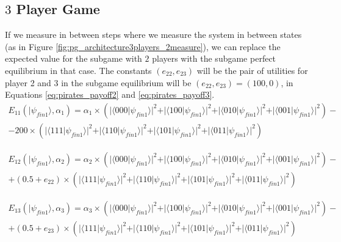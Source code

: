 \subsection{$3$ Player Game}
\label{subsec:3playergame}





If we measure in between steps where we measure the system in between states (as in Figure \ref{fig:pg_architecture3players_2measure}), we can replace the expected value for the subgame with $2$ players with the subgame perfect equilibrium in that case. The constants $(e_{22}, e_{23})$ will be the pair of utilities for player 2 and 3 in the subgame equilibrium will be $(e_{22}, e_{23})=(100, 0)$, in Equations \ref{eq:pirates_payoff2} and \ref{eq:pirates_payoff3}.  
 \begin{equation}
\begin{split}
E_{11}(\vert\psi_{fin1}\rangle, \alpha_{1})=\alpha_{1}\times(\vert\langle000\vert\psi_{fin1}\rangle\vert^{2} + \vert\langle100\vert\psi_{fin1}\rangle\vert^{2}
+ \vert\langle010\vert\psi_{fin1}\rangle\vert^{2}
+ \vert\langle001\vert\psi_{fin1}\rangle\vert^{2}
 ) - \\
 - 200\times(\vert\langle111\vert\psi_{fin1}\rangle\vert^{2} + \vert\langle110\vert\psi_{fin1}\rangle\vert^{2}
+ \vert\langle101\vert\psi_{fin1}\rangle\vert^{2}
+ \vert\langle011\vert\psi_{fin1}\rangle\vert^{2}
 )
\end{split}
\end{equation}

 \begin{equation}
\begin{split}
E_{12}(\vert\psi_{fin1}\rangle, \alpha_{2})=\alpha_{2}\times(\vert\langle000\vert\psi_{fin1}\rangle\vert^{2} + \vert\langle100\vert\psi_{fin1}\rangle\vert^{2}
+ \vert\langle010\vert\psi_{fin1}\rangle\vert^{2}
+ \vert\langle001\vert\psi_{fin1}\rangle\vert^{2}
 ) - \\
 + (0.5 + e_{22})\times(\vert\langle111\vert\psi_{fin1}\rangle\vert^{2} + \vert\langle110\vert\psi_{fin1}\rangle\vert^{2}
+ \vert\langle101\vert\psi_{fin1}\rangle\vert^{2}
+ \vert\langle011\vert\psi_{fin1}\rangle\vert^{2}
 )
\end{split}
\label{eq:pirates_payoff2}
\end{equation}

 \begin{equation}
\begin{split}
E_{13}(\vert\psi_{fin1}\rangle, \alpha_{3})=\alpha_{3}\times(\vert\langle000\vert\psi_{fin1}\rangle\vert^{2} + \vert\langle100\vert\psi_{fin1}\rangle\vert^{2}
+ \vert\langle010\vert\psi_{fin1}\rangle\vert^{2}
+ \vert\langle001\vert\psi_{fin1}\rangle\vert^{2}
 ) - \\
 + (0.5 + e_{23})\times(\vert\langle111\vert\psi_{fin1}\rangle\vert^{2} + \vert\langle110\vert\psi_{fin1}\rangle\vert^{2}
+ \vert\langle101\vert\psi_{fin1}\rangle\vert^{2}
+ \vert\langle011\vert\psi_{fin1}\rangle\vert^{2}
 )
\end{split}
\label{eq:pirates_payoff3}
\end{equation}

